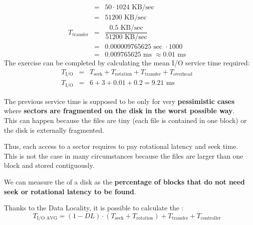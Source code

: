 \begin{exercisebox}
\begin{equation*}
\begin{array}{rcl}
            &=& 50 \cdot 1024 \text{ KB/sec} \\ [1em] 
            &=& 51200 \text{ KB/sec} \\ [1em]
            T_{\text{transfer}} &=& \dfrac{0.5 \text{ KB/sec}}{51200 \text{ KB/sec}} \\ [1em]
            &=& 0.000009765625 \text{ sec } \cdot 1000 \\ [1em]
            &=& 0.009765625 \text{ ms } \approx 0.01 \text{ ms}
        \end{array}
    \end{equation*}
    The exercise can be completed by calculating the mean I/O service time required:
    \begin{equation*}
        \begin{array}{rcl}
            T_{\text{I/O}} &=& T_{\text{seek}} + T_{\text{rotation}} + T_{\text{transfer}} + T_{\text{overhead}} \\ [.8em]
            T_{\text{I/O}} &=& 6 + 3 + 0.01 + 0.2 = 9.21 \text{ ms}
        \end{array}
    \end{equation*}
\end{exercisebox}

\noindent
The previous service time is supposed to be only for very \textbf{pessimistic cases} where \textbf{sectors are fragmented on the disk in the worst possible way}. This can happen because the files are tiny (each file is contained in one block) or the disk is externally fragmented.

\highspace
Thus, each access to a sector requires to pay rotational latency and seek time.
This is not the case in many circumstances because the files are larger than one block and stored contiguously.

\highspace
We can measure the  of a disk as the \textbf{percentage of blocks that do not need seek or rotational latency to be found}.

\highspace
Thanks to the Data Locality, it is possible to calculate the :
\begin{equation}
    T_{\text{I/O AVG}} = \left(1 - DL\right) \cdot \left(T_{\text{seek}} + T_{\text{rotation}}\right) + T_{\text{transfer}} + T_{\text{controller}}
\end{equation}


